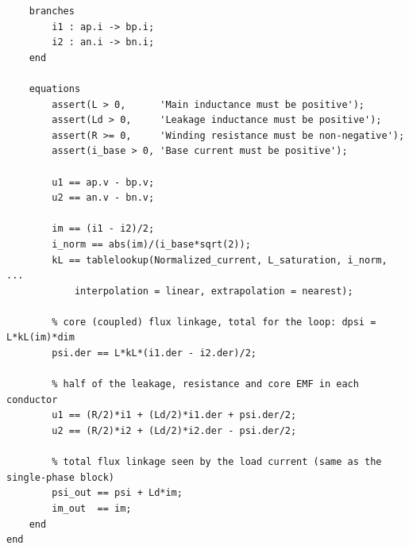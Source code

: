\documentclass[11pt,a4paper]{article}
\begin{document}
\begin{lstlisting}
    branches
        i1 : ap.i -> bp.i;
        i2 : an.i -> bn.i;
    end

    equations
        assert(L > 0,      'Main inductance must be positive');
        assert(Ld > 0,     'Leakage inductance must be positive');
        assert(R >= 0,     'Winding resistance must be non-negative');
        assert(i_base > 0, 'Base current must be positive');

        u1 == ap.v - bp.v;
        u2 == an.v - bn.v;

        im == (i1 - i2)/2;
        i_norm == abs(im)/(i_base*sqrt(2));
        kL == tablelookup(Normalized_current, L_saturation, i_norm, ...
            interpolation = linear, extrapolation = nearest);

        % core (coupled) flux linkage, total for the loop: dpsi = L*kL(im)*dim
        psi.der == L*kL*(i1.der - i2.der)/2;

        % half of the leakage, resistance and core EMF in each conductor
        u1 == (R/2)*i1 + (Ld/2)*i1.der + psi.der/2;
        u2 == (R/2)*i2 + (Ld/2)*i2.der - psi.der/2;

        % total flux linkage seen by the load current (same as the single-phase block)
        psi_out == psi + Ld*im;
        im_out  == im;
    end
end
\end{lstlisting}
\end{document}
